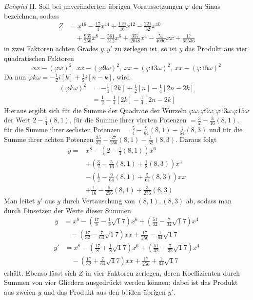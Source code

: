 \textit{Beispiel} II. Soll bei unveränderten übrigen Voraussetzungen \(\varphi\) den Sinus bezeichnen, sodass \[\begin{aligned}Z&=x^{16}-\tfrac{17}4x^{14}+\tfrac{119}{16}x^{12}-\tfrac{221}{32}x^{10}\\&\quad+\tfrac{935}{256}x^8-\tfrac{561}{512}x^6+\tfrac{357}{2048}x^4-\tfrac{51}{4096}xx+\tfrac{17}{65536}\end{aligned}\] in zwei Faktoren achten Grades \(y,\allowbreak y'\) zu zerlegen ist, so ist \(y\) das Produkt aus
vier quadratischen Faktoren \[xx-(\varphi\omega)^2,\ xx-(\varphi9\omega)^2,\ xx-(\varphi13\omega)^2,\ xx-(\varphi15\omega)^2\] Da nun \(\varphi k\omega=-\tfrac12i[k]+\tfrac12i[n-k]\), wird \[\begin{aligned}(\varphi k\omega)^2&=-\tfrac14[2k]+\tfrac12[n]-\tfrac14[2n-2k]\\&=\tfrac12-\tfrac14[2k]-\tfrac14[2n-2k]\end{aligned}\] Hieraus ergibt sich für die Summe der Quadrate der Wurzeln \(\varphi\omega,\allowbreak \varphi9\omega,\allowbreak \varphi13\omega.\varphi15\omega\) der Wert \(2-\tfrac14(8,1)\), für die Summe ihrer vierten Potenzen \(=\tfrac32-\tfrac3{16}(8,1)\), für die Summe ihrer sechsten Potenzen \(=\tfrac54-\tfrac9{64}(8,1)-\tfrac1{64}(8,3)\) und für die Summe ihrer achten Potenzen \(\tfrac{35}{32}-\tfrac{27}{256}(8,1)-\tfrac1{32}(8,3)\). Daraus folgt \[\begin{aligned}y={}&x^8-(2-\tfrac14(8,1))x^6\\&+(\tfrac32-\tfrac5{16}(8,1)+\tfrac18(8,3))x^4\\&-(\tfrac12-\tfrac9{64}(8,1)+\tfrac5{64}(8,3))xx\\&+\tfrac1{16}-\tfrac5{256}(8,1)+\tfrac3{256}(8,3)\end{aligned}\] Man leitet \(y'\) aus \(y\) durch Vertauschung von \((8,1),\allowbreak (8,3)\) ab, sodass man durch Einsetzen der Werte dieser Summen \[\begin{aligned}y&=x^8-(\tfrac{17}8-\tfrac18\surd17)x^6+(\tfrac{51}{32}-\tfrac7{32}\surd17)x^4\\&\quad-(\tfrac{17}{32}-\tfrac7{64}\surd17)xx+\tfrac{17}{256}-\tfrac1{64}\surd17\end{aligned}\] \[\begin{aligned}y'&=x^8-(\tfrac{17}8+\tfrac18\surd17)x^6+(\tfrac{51}{32}+\tfrac7{32}\surd17)x^4\\&\quad-(\tfrac{17}{32}+\tfrac7{64}\surd17)xx+\tfrac{17}{256}+\tfrac1{64}\surd17\end{aligned}\] erhält. Ebenso lässt sich \(Z\) in vier Faktoren zerlegen, deren Koeffizienten durch Summen von vier Gliedern ausgedrückt werden können; dabei ist das Produkt aus zweien \(y\) und das Produkt aus den beiden übrigen \(y'\).



